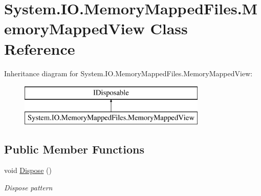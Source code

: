 \hypertarget{class_system_1_1_i_o_1_1_memory_mapped_files_1_1_memory_mapped_view}{}\section{System.\+I\+O.\+Memory\+Mapped\+Files.\+Memory\+Mapped\+View Class Reference}
\label{class_system_1_1_i_o_1_1_memory_mapped_files_1_1_memory_mapped_view}


 


Inheritance diagram for System.\+I\+O.\+Memory\+Mapped\+Files.\+Memory\+Mapped\+View\+:\begin{figure}[H]
\begin{center}
\leavevmode
\includegraphics[height=2.000000cm]{class_system_1_1_i_o_1_1_memory_mapped_files_1_1_memory_mapped_view}
\end{center}
\end{figure}
\subsection*{Public Member Functions}
\begin{DoxyCompactItemize}
\item 
void \hyperlink{class_system_1_1_i_o_1_1_memory_mapped_files_1_1_memory_mapped_view_aff06d7683c33a9e4575bd6ca9c65841f}{Dispose} ()
\begin{DoxyCompactList}\small\item\em Dispose pattern \end{DoxyCompactList}\end{DoxyCompactItemize}
